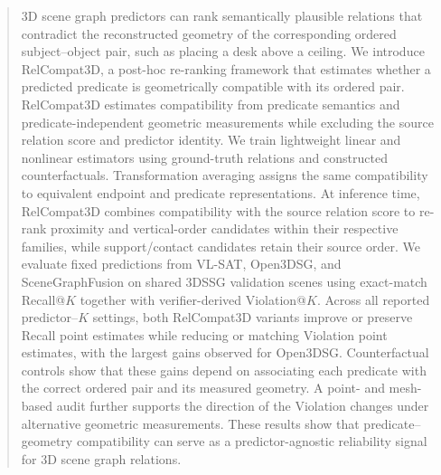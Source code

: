 \begin{abstract}
    3D scene graph predictors can rank semantically plausible relations that contradict the reconstructed geometry of the corresponding ordered subject--object pair, such as placing a desk above a ceiling. We introduce RelCompat3D, a post-hoc re-ranking framework that estimates whether a predicted predicate is geometrically compatible with its ordered pair. RelCompat3D estimates compatibility from predicate semantics and predicate-independent geometric measurements while excluding the source relation score and predictor identity. We train lightweight linear and nonlinear estimators using ground-truth relations and constructed counterfactuals. Transformation averaging assigns the same compatibility to equivalent endpoint and predicate representations. At inference time, RelCompat3D combines compatibility with the source relation score to re-rank proximity and vertical-order candidates within their respective families, while support/contact candidates retain their source order. We evaluate fixed predictions from VL-SAT, Open3DSG, and SceneGraphFusion on shared 3DSSG validation scenes using exact-match Recall@$K$ together with verifier-derived Violation@$K$. Across all reported predictor--$K$ settings, both RelCompat3D variants improve or preserve Recall point estimates while reducing or matching Violation point estimates, with the largest gains observed for Open3DSG. Counterfactual controls show that these gains depend on associating each predicate with the correct ordered pair and its measured geometry. A point- and mesh-based audit further supports the direction of the Violation changes under alternative geometric measurements. These results show that predicate--geometry compatibility can serve as a predictor-agnostic reliability signal for 3D scene graph relations.
\end{abstract}
